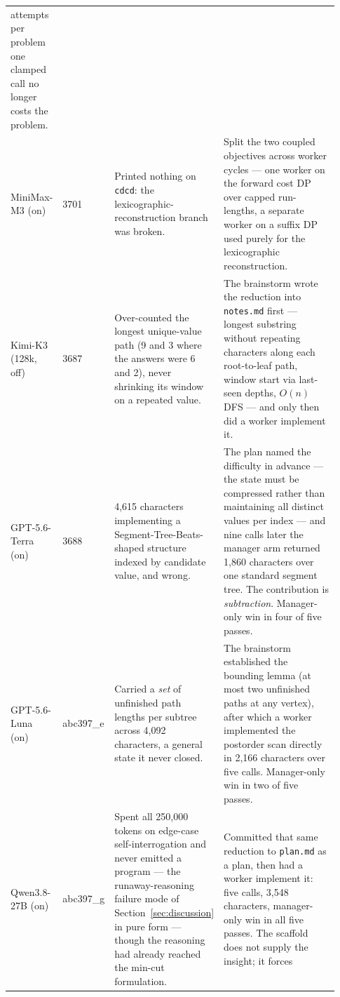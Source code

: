 \documentclass{article}
\begin{document}
\begin{table}[p]
\begin{tabular}{@{}p{0.155\linewidth}p{0.101\linewidth}p{0.310\linewidth}p{0.364\linewidth}@{}}
attempts per problem one clamped call no longer costs the problem. \\
\addlinespace
MiniMax-M3 \newline (on) & 3701 & Printed nothing on \texttt{cdcd}: the lexicographic-reconstruction
branch was broken. & Split the two coupled objectives across worker cycles --- one worker on the
forward cost DP over capped run-lengths, a separate worker on a suffix DP used purely for the
lexicographic reconstruction. \\
\addlinespace
Kimi-K3 \newline (128k, off) & 3687 & Over-counted the longest unique-value path (9 and 3 where the
answers were 6 and 2), never shrinking its window on a repeated value. & The brainstorm wrote the
reduction into \texttt{notes.md} first --- longest substring without repeating characters along each
root-to-leaf path, window start via last-seen depths, $O(n)$ DFS --- and only then did a worker
implement it. \\
\addlinespace
GPT-5.6-Terra \newline (on) & 3688 & 4,615 characters implementing a Segment-Tree-Beats-shaped
structure indexed by candidate value, and wrong. & The plan named the difficulty in advance --- the
state must be compressed rather than maintaining all distinct values per index --- and nine calls
later the manager arm returned 1,860 characters over one standard segment tree. The contribution is
\emph{subtraction}. Manager-only win in four of five passes. \\
\addlinespace
GPT-5.6-Luna \newline (on) & abc397\_e & Carried a \emph{set} of unfinished path lengths per subtree
across 4,092 characters, a general state it never closed. & The brainstorm established the bounding
lemma (at most two unfinished paths at any vertex), after which a worker implemented the postorder
scan directly in 2,166 characters over five calls. Manager-only win in two of five passes. \\
\addlinespace
Qwen3.8-27B \newline (on) & abc397\_g & Spent all 250,000 tokens on edge-case self-interrogation and
never emitted a program --- the runaway-reasoning failure mode of Section~\ref{sec:discussion} in
pure form --- though the reasoning had already reached the min-cut formulation. & Committed that
same reduction to \texttt{plan.md} as a plan, then had a worker implement it: five calls, 3,548
characters, manager-only win in all five passes. The scaffold does not supply the insight; it forces

\end{tabular}
\end{table}
\end{document}
